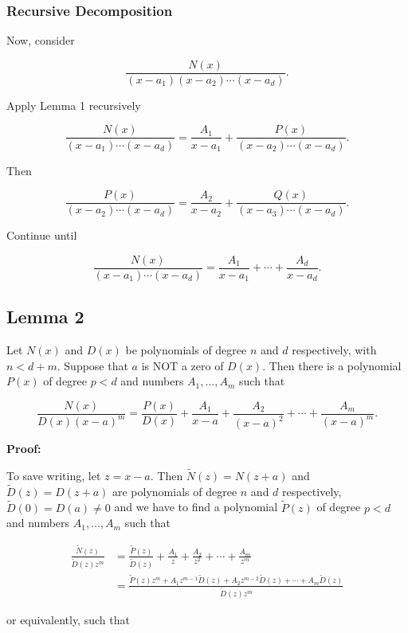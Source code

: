 \subsubsection{Recursive Decomposition}

Now, consider

\[
    \frac{N(x)}{(x - a_1)(x - a_2)\cdots(x - a_d)}.
\]

Apply Lemma 1 recursively

\[
    \frac{N(x)}{(x - a_1)\cdots(x - a_d)} = \frac{A_1}{x - a_1} + \frac{P(x)}{(x - a_2)\cdots(x - a_d)}.
\]

Then

\[
    \frac{P(x)}{(x - a_2)\cdots(x - a_d)} = \frac{A_2}{x - a_2} + \frac{Q(x)}{(x - a_3)\cdots(x - a_d)}.
\]

Continue until

\[
    \frac{N(x)}{(x - a_1)\cdots(x - a_d)} = \frac{A_1}{x - a_1} + \cdots + \frac{A_d}{x - a_d}.
\]

\subsection{Lemma 2}

Let \(N(x)\) and \(D(x)\) be polynomials of degree \(n\) and \(d\) respectively, with \(n < d + m\).
Suppose that \(a\) is NOT a zero of \(D(x)\). Then there is a polynomial \(P(x)\) of degree \(p < d\) and
numbers \(A_1, \dots, A_m\) such that

\[
    \frac{N(x)}{D(x) {(x-a)}^m} = \frac{P(x)}{D(x)} + \frac{A_1}{x-a} + \frac{A_2}{{(x-a)}^2} + \cdots + 
    \frac{A_m}{{(x-a)}^m}.
\]

\textbf{Proof:} 

To save writing, let \(z = x - a\). Then \(\tilde{N}(z) = N(z + a)\) and \(\tilde{D}(z) = D(z + a)\)
are polynomials of degree \(n\) and \(d\) respectively, \(\tilde{D}(0) = D(a) \neq 0\) and we have to find a
polynomial \(\tilde{P}(z)\) of degree \(p < d\) and numbers \(A_1, \dots, A_m\) such that

\begin{align*}
    \frac{\tilde{N}(z)}{\tilde{D}(z) z^m} &= \frac{\tilde{P}(z)}{\tilde{D}(z)} + \frac{A_1}{z} + \frac{A_2}{z^2} + \cdots + \frac{A_m}{z^m} \\
    &= \frac{\tilde{P}(z) z^m + A_1 z^{m-1} \tilde{D}(z) + A_2 z^{m-2} \tilde{D}(z) + \cdots + A_m \tilde{D}(z)}{\tilde{D}(z) z^m}
\end{align*}

or equivalently, such that

